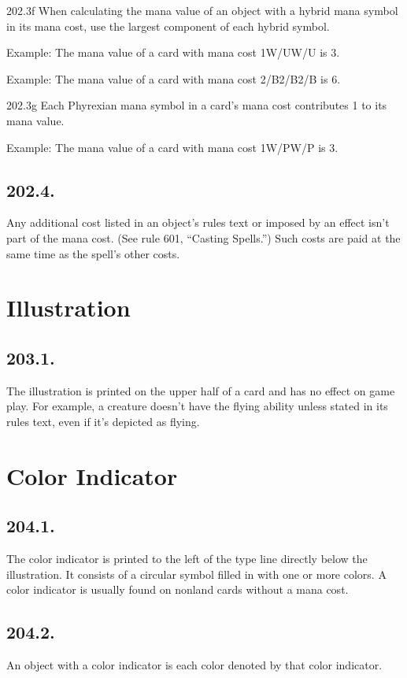 202.3f When calculating the mana value of an object with a hybrid mana symbol in its mana cost, use the largest component of each hybrid symbol.

Example: The mana value of a card with mana cost {1}{W/U}{W/U} is 3.

Example: The mana value of a card with mana cost {2/B}{2/B}{2/B} is 6.

202.3g Each Phyrexian mana symbol in a card’s mana cost contributes 1 to its mana value.

Example: The mana value of a card with mana cost {1}{W/P}{W/P} is 3.

\subsection*{202.4.}
Any additional cost listed in an object’s rules text or imposed by an effect isn’t part of the mana cost. (See rule 601, “Casting Spells.”) Such costs are paid at the same time as the spell’s other costs.

\section{Illustration}
\subsection*{203.1.}
The illustration is printed on the upper half of a card and has no effect on game play. For example, a creature doesn’t have the flying ability unless stated in its rules text, even if it’s depicted as flying.

\section{Color Indicator}
\subsection*{204.1.}
The color indicator is printed to the left of the type line directly below the illustration. It consists of a circular symbol filled in with one or more colors. A color indicator is usually found on nonland cards without a mana cost.

\subsection*{204.2.}
An object with a color indicator is each color denoted by that color indicator.

